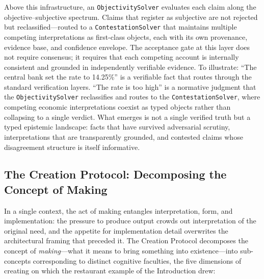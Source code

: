 \documentclass[11pt]{article}
\let\oldtexttt\texttt
\renewcommand{\texttt}[1]{\oldtexttt{\small #1}}
\begin{document}
Above this infrastructure, an \texttt{ObjectivitySolver} evaluates each claim along the objective--subjective spectrum. Claims that register as subjective are not rejected but reclassified---routed to a \texttt{ContestationSolver} that maintains multiple competing interpretations as first-class objects, each with its own provenance, evidence base, and confidence envelope. The acceptance gate at this layer does not require consensus; it requires that each competing account is internally consistent and grounded in independently verifiable evidence. To illustrate: ``The central bank set the rate to 14.25\%'' is a verifiable fact that routes through the standard verification layers. ``The rate is too high'' is a normative judgment that the \texttt{ObjectivitySolver} reclassifies and routes to the \texttt{ContestationSolver}, where competing economic interpretations coexist as typed objects rather than collapsing to a single verdict. What emerges is not a single verified truth but a typed epistemic landscape: facts that have survived adversarial scrutiny, interpretations that are transparently grounded, and contested claims whose disagreement structure is itself informative.

\subsection{The Creation Protocol: Decomposing the Concept of Making}
\label{sec:maker}

In a single context, the act of making entangles interpretation, form, and implementation: the pressure to produce output crowds out interpretation of the original need, and the appetite for implementation detail overwrites the architectural framing that preceded it. The Creation Protocol decomposes the concept of \emph{making}---what it means to bring something into existence---into sub-concepts corresponding to distinct cognitive faculties, the five dimensions of creating on which the restaurant example of the Introduction drew:
\end{document}

